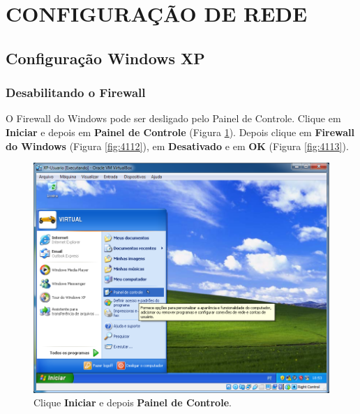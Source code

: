 \documentclass[10pt]{article}
\begin{document}
\section{CONFIGURAÇÃO DE REDE}
\subsection{Configuração Windows XP}
\subsubsection{Desabilitando o Firewall}
\par O Firewall do Windows pode ser desligado pelo Painel de Controle. Clique em \textbf{Iniciar} e depois em \textbf{Painel de Controle} (Figura \ref{fig:4111}). Depois clique em \textbf{Firewall do Windows} (Figura \ref{fig:4112}), em \textbf{Desativado} e em \textbf{OK} (Figura \ref{fig:4113}).

\begin{figure}[H]
    \centering
    \caption{Clique \textbf{Iniciar} e depois \textbf{Painel de Controle}.}
    \label{fig:4111}
    \includegraphics[width=\linewidth]{images/xp_rede/001.png}
\end{figure}
\end{document}
